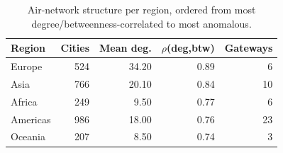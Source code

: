 \begin{table}[t]
\centering
\caption{Air-network structure per region, ordered from most degree/betweenness-correlated to most anomalous.}
\label{tab:structure}
\begin{tabular}{lrrrr}
\toprule
Region & Cities & Mean deg. & $\rho$(deg,btw) & Gateways \\
\midrule
Europe & 524 & 34.20 & 0.89 & 6 \\
Asia & 766 & 20.10 & 0.84 & 10 \\
Africa & 249 & 9.50 & 0.77 & 6 \\
Americas & 986 & 18.00 & 0.76 & 23 \\
Oceania & 207 & 8.50 & 0.74 & 3 \\
\bottomrule
\end{tabular}
\end{table}
